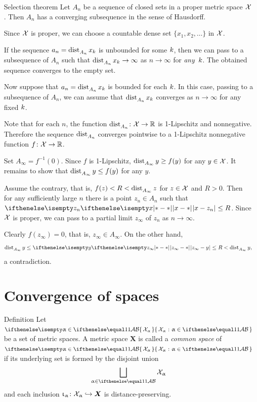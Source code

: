 \begin{thm}{Selection theorem}
Let $A_n$ be a sequence of closed sets in a proper metric space $\mathcal{X}$.
Then $A_n$ has a converging subsequence in the sense of Hausdorff.
\end{thm}

Since $\mathcal{X}$ is proper,
we can choose a countable dense set $\{x_1,x_2, \dots\}$ in $\mathcal{X}$.

If the sequence $a_n=\mathop{\rm dist}\nolimits_{A_n}^{{}}x_k$ is unbounded for some $k$,
then we can pass to a subsequence of $A_n$ such that 
$\distfun{A_n}x_\kay\to \infty$ as $n\to\infty$ for \emph{any}~$k$.
The obtained sequence converges to the empty set.

Now suppose that $a_n=\mathop{\rm dist}\nolimits_{A_n}^{{}}x_k$ is bounded for each $k$. 
In this case, passing to a subsequence of $A_n$,
we can assume that $\mathop{\rm dist}\nolimits_{A_n}^{{}}x_k$ converges as $n\to\infty$ for any fixed $k$.

Note that for each $n$, the function $\distfun{A_n}\:\spc{X}\to\RR$ is 1-Lipschitz and nonnegative.
Therefore the sequence $\mathop{\rm dist}\nolimits_{A_n}^{{}}$ converges pointwise to a 1-Lipschitz nonnegative function $f\:\spc{X}\to\RR$.

Set $A_\infty=f^{-1}(0)$.
Since $f$ is 1-Lipschitz, 
$\distfun{A_\infty}y\ge f(y)$ for any $y\in \spc{X}$.
It remains to show that $\distfun{A_\infty}y\le f(y)$ for any $y$.

Assume the  contrary,
that is, $f(z)<R<\mathop{\rm dist}\nolimits_{A_\infty}^{{}}z$ for $z\in \spc{X}$ and $R>0$.
Then for any sufficiently large $n$ there is a point $z_n\in A_n$ such that
$\dist{x}{z_n}{}\le R$.
Since $\mathcal{X}$ is proper, we can pass to a partial limit $z_\infty$ of $z_n$ as $n\to\infty$.

Clearly  $f(z_\infty)=0$, that is, $z_\infty\in A_\infty$.
On the other hand, 
\[\distfun{A_\infty}y\le\dist{z_\infty}{y}{}\le R<\distfun{A_\infty}y,\] 
a contradiction.
\qeds

\section{Convergence of spaces}

\begin{thm}{Definition}\label{def:comp-metr}
Let $\set{\spc{X}_\alpha}{\alpha\in\IndexSet}$ be a set of metric spaces.
A metric space $\bm{X}$
is called a \emph{common space} of $\set{\spc{X}_\alpha}{\alpha\in\IndexSet}$ if its underlying set is formed by the disjoint union
$$\bigsqcup_{\alpha\in\IndexSet} \spc{X}_\alpha$$ 
and each inclusion $\iota_\alpha\:\spc{X}_\alpha\hookrightarrow\bm{X}$
is distance-preserving.
\end{thm}

